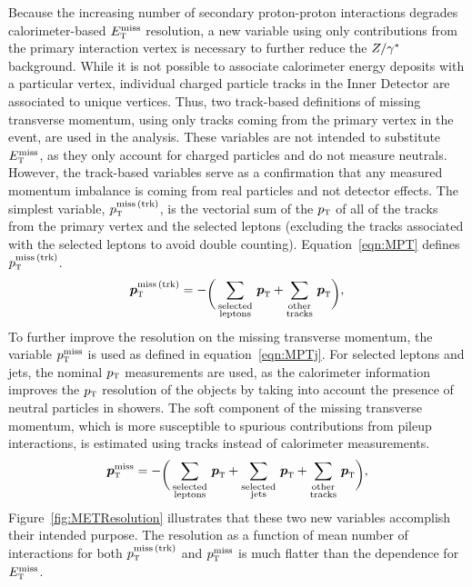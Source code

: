 Because the increasing number of secondary proton-proton interactions degrades calorimeter-based $E_{\textrm{\footnotesize\sc t}}^{\rm miss}$ resolution, a new variable using only contributions from the primary interaction vertex is necessary to further reduce the $Z/\gamma^{\ast}$ background. While it is not possible to associate calorimeter energy deposits with a particular vertex, individual charged particle tracks in the Inner Detector are associated to unique vertices. Thus, two track-based definitions of missing transverse momentum, using only tracks coming from the primary vertex in the event, are used in the analysis. These variables are not intended to substitute $E_{\textrm{\footnotesize\sc t}}^{\rm miss}$, as they only account for charged particles and do not measure neutrals. However, the track-based variables serve as a confirmation that any measured momentum imbalance is coming from real particles and not detector effects. The simplest variable, $p_{\textrm{\footnotesize\sc t}}^{\rm miss\,(trk)}$, is the vectorial sum of the $p_{\textrm{\footnotesize\sc t}}$ of all of the tracks from the primary vertex and the selected leptons (excluding the tracks associated with the selected leptons to avoid double counting). Equation~\ref{eqn:MPT} defines $p_{\textrm{\footnotesize\sc t}}^{\rm miss\,(trk)}$.
%
\begin{equation}
\vMPT = -\raisebox{-3.0pt}{\bigg(}%
     \displaystyle
     \sum_{\substack{\rm selected \\ \rm leptons}}\,\vpT
   + \sum_{\substack{\rm other \\ \rm tracks}}\,\vpT
   \raisebox{-3.0pt}{\bigg)},
\label{eqn:MPT}
\end{equation} 
%
To further improve the resolution on the missing transverse momentum, the variable $p_{\textrm{\footnotesize\sc t}}^{\rm miss}$ is used as defined in equation~\ref{eqn:MPTj}. For selected leptons and jets, the nominal $p_{\textrm{\footnotesize\sc t}}$ measurements are used, as the calorimeter information improves the $p_{\textrm{\footnotesize\sc t}}$ resolution of the objects by taking into account the presence of neutral particles in showers. The soft component of the missing transverse momentum, which is more susceptible to spurious contributions from pileup interactions, is estimated using tracks instead of calorimeter measurements. 
%
\begin{equation}
\vMPTj = -\raisebox{-3.0pt}{\bigg(}%
     \displaystyle
     \sum_{\substack{\rm selected \\ \rm leptons}}\,\vpT
   + \sum_{\substack{\rm selected \\ \rm jets}}\,\vpT
   + \sum_{\substack{\rm other \\ \rm tracks}}\,\vpT
   \raisebox{-3.0pt}{\bigg)},
\label{eqn:MPTj}
\end{equation} 
%
Figure~\ref{fig:METResolution} illustrates that these two new variables accomplish their intended purpose. The resolution as a function of mean number of interactions for both $p_{\textrm{\footnotesize\sc t}}^{\rm miss\,(trk)}$ and $p_{\textrm{\footnotesize\sc t}}^{\rm miss}$ is much flatter than the dependence for $E_{\textrm{\footnotesize\sc t}}^{\rm miss}$. 
